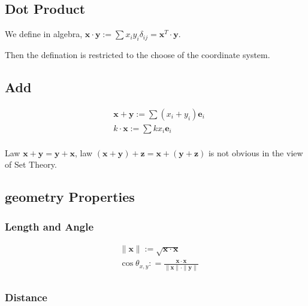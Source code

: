 \documentclass[UTF8]{../../09-Mathematics}
\begin{document}
\subsection{Dot Product}

We define in algebra, $ \boldsymbol{x} \cdot \boldsymbol{y} := \sum{x_iy_i \delta _{ij}} = \boldsymbol{x}^T \cdot \boldsymbol{y}$.

Then the defination is restricted to the choose of the coordinate system. 



\subsection{Add}

\begin{equation}
    \begin{split}
    & \boldsymbol x + \boldsymbol y := \sum (x_i + y_i)\boldsymbol e_i\\
    & k \cdot \boldsymbol x := \sum kx_i\boldsymbol e_i\\
\end{split}
\end{equation}

Law $\boldsymbol{x} + \boldsymbol{y} = \boldsymbol{y} + \boldsymbol{x}$,
law $ (\boldsymbol{x} + \boldsymbol{y} )+ \boldsymbol{z} = \boldsymbol{x} +( \boldsymbol{y} + \boldsymbol{z})$ is not obvious in the view of Set Theory.


\subsection{geometry Properties}

\subsubsection{Length and Angle}

\begin{equation}
    \begin{split}
    &\parallel \boldsymbol{x} \parallel := \sqrt{\boldsymbol x \cdot \boldsymbol x}\\
    &\cos {\theta_{x,y}} : = \frac
    {\boldsymbol x \cdot \boldsymbol x}
    {\parallel \boldsymbol{x} \parallel \cdot \parallel \boldsymbol{y} \parallel}\\
\end{split}
\end{equation}


\subsubsection{Distance}
\end{document}
